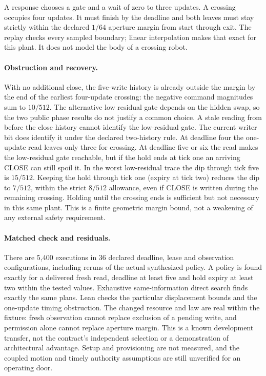 \documentclass{article}
\begin{document}
A response chooses a gate and a wait of zero to three updates.
A crossing occupies four updates. It must finish by the deadline
and both leaves must stay strictly within the declared
$1/64$ aperture margin from start through exit. The replay checks
every sampled boundary; linear interpolation makes that exact
for this plant. It does not model the body of a crossing robot.

\paragraph{Obstruction and recovery.}
With no additional close, the five-write history is already
outside the margin by the end of the earliest four-update
crossing: the negative command magnitudes sum to $10/512$.
The alternative low residual gate depends on the hidden swap,
so the two public phase results do not justify a common choice.
A stale reading from before the close history cannot identify the
low-residual gate. The current writer bit does identify it under
the declared two-history rule. At deadline four the one-update
read leaves only three for crossing. At deadline five or six the
read makes the low-residual gate reachable, but if the hold ends
at tick one an arriving CLOSE can still spoil it. In the worst
low-residual trace the dip through tick five is $15/512$.
Keeping the hold through tick one (expiry at tick two) reduces the
dip to $7/512$, within the strict $8/512$ allowance, even if CLOSE
is written during the remaining crossing. Holding until the
crossing ends is sufficient but not necessary in this same plant.
This is a finite geometric margin bound, not a weakening of any
external safety requirement.

\paragraph{Matched check and residuals.}
There are 5,400 executions in 36 declared deadline, lease and
observation configurations, including reruns of the actual
synthesized policy. A policy is found exactly for a delivered
fresh read, deadline at least five and hold expiry at least two
within the tested values. Exhaustive same-information direct search
finds exactly the same plans. Lean checks the particular
displacement bounds and the one-update timing obstruction.
The changed resource and law are real within the fixture: fresh
observation cannot replace exclusion of a pending write, and
permission alone cannot replace aperture margin. This is a
known development transfer, not the contract's independent
selection or a demonstration of architectural advantage. Setup and
provisioning are not measured, and the coupled motion and timely
authority assumptions are still unverified for an operating door.
\end{document}
